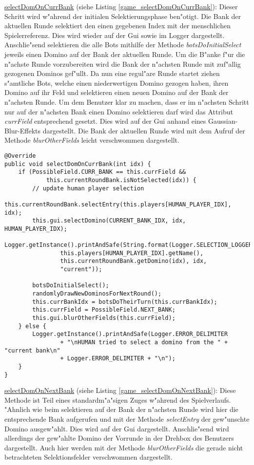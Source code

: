 \underline{selectDomOnCurrBank} (siehe Listing \ref{game_selectDomOnCurrBank}): Dieser Schritt wird w"ahrend der initialen Selektierungsphase ben"otigt. Die Bank der aktuellen Runde selektiert den einen gegebenen Index mit der menschlichen Spielerreferenz. Dies wird wieder auf der Gui sowie im Logger dargestellt. Anschlie"send selektieren die alle Bots mithilfe der Methode \emph{botsDoInitialSelect} jeweils einen Domino auf der Bank der aktuellen Runde. Um die B"anke f"ur die n"achste Runde vorzubereiten wird die Bank der n"achsten Runde mit zuf"allig gezogenen Dominos gef"ullt. Da nun eine regul"are Runde startet ziehen s"amtliche Bots, welche einen niederwertigen Domino gezogen haben, ihren Domino auf ihr Feld und selektieren einen neuen Domino auf der Bank der n"achsten Runde. Um dem Benutzer klar zu machen, dass er im n"achsten Schritt nur auf der n"achsten Bank einen Domino selektieren darf wird das Attribut \emph{currField} entsprechend gesetzt. Dies wird auf der Gui anhand eines Gaussian-Blur-Effekts dargestellt. Die Bank der aktuellen Runde wird mit dem Aufruf der Methode \emph{blurOtherFields} leicht verschwommen dargestellt. 

\begin{lstlisting}[float,style=CodeHighlighting,label=game_selectDomOnCurrBank,caption=Game - selectDomOnCurrBank]
@Override
public void selectDomOnCurrBank(int idx) {
    if (PossibleField.CURR_BANK == this.currField &&
    		this.currentRoundBank.isNotSelected(idx)) {
        // update human player selection
        this.currentRoundBank.selectEntry(this.players[HUMAN_PLAYER_IDX], idx);
        this.gui.selectDomino(CURRENT_BANK_IDX, idx, HUMAN_PLAYER_IDX);
        Logger.getInstance().printAndSafe(String.format(Logger.SELECTION_LOGGER_FORMAT,
                this.players[HUMAN_PLAYER_IDX].getName(),
                this.currentRoundBank.getDomino(idx), idx,
                "current"));

        botsDoInitialSelect();
        randomlyDrawNewDominosForNextRound();
        this.currBankIdx = botsDoTheirTurn(this.currBankIdx);
        this.currField = PossibleField.NEXT_BANK;
        this.gui.blurOtherFields(this.currField);
    } else {
        Logger.getInstance().printAndSafe(Logger.ERROR_DELIMITER
                + "\nHUMAN tried to select a domino from the " + "current bank\n" 
                + Logger.ERROR_DELIMITER + "\n");
    }
}
\end{lstlisting}

\underline{selectDomOnNextBank} (siehe Listing \ref{game_selectDomOnNextBank}): Diese Methode ist Teil eines standardm"a"sigen Zuges w"ahrend des Spielverlaufs. "Ahnlich wie beim selektieren auf der Bank der n"achsten Runde wird hier die entsprechende Bank aufgerufen und mit der Methode \emph{selectEntry} der gew"unschte Domino ausgew"ahlt. Dies wird auf der Gui dargestellt. Anschlie"send wird allerdings der gew"ahlte Domino der Vorrunde in der Drehbox des Benutzers dargestellt. Auch hier werden mit der Methode \emph{blurOtherFields} die gerade nicht betrachteten Selektionsfelder verschwommen dargestellt. 

